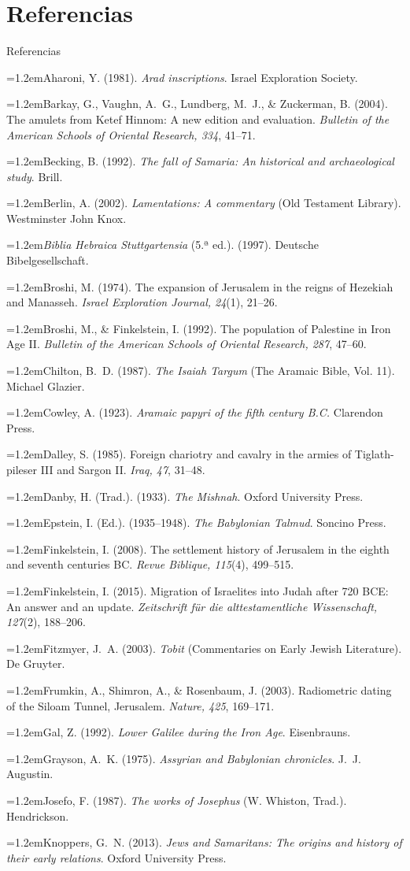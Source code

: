 \documentclass[hyperref={bookmarks=false},aspectratio=169]{beamer}
\newcommand{\refapa}[1]{\par\hangindent=1.2em\hangafter=1\noindent #1\par\vspace{3pt}}
\begin{document}
\section{Referencias}
\begin{frame}[allowframebreaks]{Referencias}
\tiny
\refapa{Aharoni, Y. (1981). \emph{Arad inscriptions}. Israel Exploration Society.}
\refapa{Barkay, G., Vaughn, A.~G., Lundberg, M.~J., \& Zuckerman, B. (2004). The amulets from Ketef Hinnom: A new edition and evaluation. \emph{Bulletin of the American Schools of Oriental Research, 334}, 41--71.}
\refapa{Becking, B. (1992). \emph{The fall of Samaria: An historical and archaeological study}. Brill.}
\refapa{Berlin, A. (2002). \emph{Lamentations: A commentary} (Old Testament Library). Westminster John Knox.}
\refapa{\emph{Biblia Hebraica Stuttgartensia} (5.ª ed.). (1997). Deutsche Bibelgesellschaft.}
\refapa{Broshi, M. (1974). The expansion of Jerusalem in the reigns of Hezekiah and Manasseh. \emph{Israel Exploration Journal, 24}(1), 21--26.}
\refapa{Broshi, M., \& Finkelstein, I. (1992). The population of Palestine in Iron Age II. \emph{Bulletin of the American Schools of Oriental Research, 287}, 47--60.}
\refapa{Chilton, B.~D. (1987). \emph{The Isaiah Targum} (The Aramaic Bible, Vol. 11). Michael Glazier.}
\refapa{Cowley, A. (1923). \emph{Aramaic papyri of the fifth century B.C.} Clarendon Press.}
\refapa{Dalley, S. (1985). Foreign chariotry and cavalry in the armies of Tiglath-pileser III and Sargon II. \emph{Iraq, 47}, 31--48.}
\refapa{Danby, H. (Trad.). (1933). \emph{The Mishnah}. Oxford University Press.}
\refapa{Epstein, I. (Ed.). (1935--1948). \emph{The Babylonian Talmud}. Soncino Press.}
\refapa{Finkelstein, I. (2008). The settlement history of Jerusalem in the eighth and seventh centuries BC. \emph{Revue Biblique, 115}(4), 499--515.}
\refapa{Finkelstein, I. (2015). Migration of Israelites into Judah after 720 BCE: An answer and an update. \emph{Zeitschrift für die alttestamentliche Wissenschaft, 127}(2), 188--206.}
\refapa{Fitzmyer, J.~A. (2003). \emph{Tobit} (Commentaries on Early Jewish Literature). De Gruyter.}
\refapa{Frumkin, A., Shimron, A., \& Rosenbaum, J. (2003). Radiometric dating of the Siloam Tunnel, Jerusalem. \emph{Nature, 425}, 169--171.}
\refapa{Gal, Z. (1992). \emph{Lower Galilee during the Iron Age}. Eisenbrauns.}
\refapa{Grayson, A.~K. (1975). \emph{Assyrian and Babylonian chronicles}. J.~J. Augustin.}
\refapa{Josefo, F. (1987). \emph{The works of Josephus} (W. Whiston, Trad.). Hendrickson.}
\refapa{Knoppers, G.~N. (2013). \emph{Jews and Samaritans: The origins and history of their early relations}. Oxford University Press.}

\end{frame}
\end{document}
